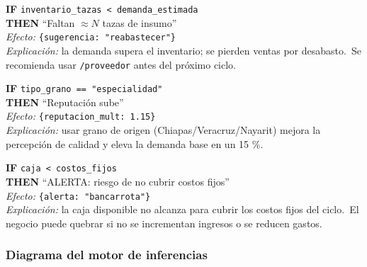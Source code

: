 \documentclass[12pt,spanish]{article}
\begin{document}
\begin{tcolorbox}[
  title={Regla 2 — Stock insuficiente}, colframe=amarillo!80!black,
  colback=amarillo!10, fonttitle=\bfseries, breakable
]
\textbf{IF} \texttt{inventario\_tazas < demanda\_estimada}\\
\textbf{THEN} ``Faltan $\approx N$ tazas de insumo''\\[4pt]
\textit{Efecto:} \texttt{\{sugerencia: "reabastecer"\}}\\
\textit{Explicación:} la demanda supera el inventario; se pierden
                      ventas por desabasto.\ Se recomienda usar
                      \texttt{/proveedor} antes del próximo ciclo.
\end{tcolorbox}

\begin{tcolorbox}[
  title={Regla 3 — Grano de especialidad}, colframe=verde,
  colback=verde!8, fonttitle=\bfseries, breakable
]
\textbf{IF} \texttt{tipo\_grano == "especialidad"}\\
\textbf{THEN} ``Reputación sube''\\[4pt]
\textit{Efecto:} \texttt{\{reputacion\_mult: 1.15\}}\\
\textit{Explicación:} usar grano de origen (Chiapas/Veracruz/Nayarit)
                      mejora la percepción de calidad y eleva la
                      demanda base en un 15 \%.
\end{tcolorbox}

\begin{tcolorbox}[
  title={Regla 4 — Riesgo de bancarrota}, colframe=rojo!80!black,
  colback=rojo!12, fonttitle=\bfseries, breakable
]
\textbf{IF} \texttt{caja < costos\_fijos}\\
\textbf{THEN} ``ALERTA: riesgo de no cubrir costos fijos''\\[4pt]
\textit{Efecto:} \texttt{\{alerta: "bancarrota"\}}\\
\textit{Explicación:} la caja disponible no alcanza para cubrir los
                      costos fijos del ciclo.\ El negocio puede quebrar
                      si no se incrementan ingresos o se reducen gastos.
\end{tcolorbox}

\subsubsection*{Diagrama del motor de inferencias}
\end{document}
